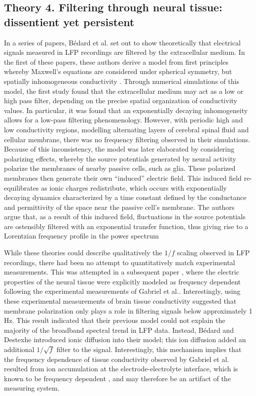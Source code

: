 \subsection{Theory 4. Filtering through neural tissue: dissentient yet persistent} \label{sec:filter_theory}
In a series of papers, Bédard et al.\cite{Bedard2004,Bedard2006a,Bedard2009} set out to show theoretically that electrical signals measured in LFP recordings are filtered by the extracellular medium. In the first of these papers, these authors derive a model from first principles whereby Maxwell’s equations are considered under spherical symmetry, but spatially inhomogeneous conductivity \cite{Bedard2004}. Through numerical simulations of this model, the first study found that the extracellular medium may act as a low or high pass filter, depending on the precise spatial organization of conductivity values. In particular, it was found that an exponentially decaying inhomogeneity allows for a low-pass filtering phenomenology. However, with periodic high and low conductivity regions, modelling alternating layers of cerebral spinal fluid and cellular membrane, there was no frequency filtering observed in their simulations. Because of this inconsistency, the model was later elaborated \cite{Bedard2006a} by considering polarizing effects, whereby the source potentials generated by neural activity polarize the membranes of nearby passive cells, such as glia. These polarized membranes then generate their own “induced” electric field. This induced field re-equilibrates as ionic charges redistribute, which occurs with exponentially decaying dynamics characterized by a time constant defined by the conductance and permittivity of the space near the passive cell’s membrane. The authors argue that, as a result of this induced field, fluctuations in the source potentials are ostensibly filtered with an exponential transfer function, thus giving rise to a Lorentzian frequency profile in the power spectrum

While these theories could describe qualitatively the $1/f$ scaling observed in LFP recordings, there had been no attempt to quantitatively match experimental measurements. This was attempted in a subsequent paper \cite{Bedard2009}, where the electric properties of the neural tissue were explicitly modeled as frequency dependent following the experimental measurements of Gabriel et al.\cite{Gabriel1996}. Interestingly, using these experimental measurements of brain tissue conductivity suggested that membrane polarization only plays a role in filtering signals below approximately 1 Hz. This result indicated that their previous model \cite{Bedard2006a} could not explain the majority of the broadband spectral trend in LFP data. Instead, Bédard and Destexhe\cite{Bedard2006a} introduced ionic diffusion into their model; this ion diffusion added an additional $1/\sqrt{f}$ filter to the signal. Interestingly, this mechanism implies that the frequency dependence of tissue conductivity observed by Gabriel et al.\cite{Gabriel1996} resulted from ion accumulation at the electrode-electrolyte interface, which is known to be frequency dependent \cite{Warburg1899}, and may therefore be an artifact of the measuring system.

